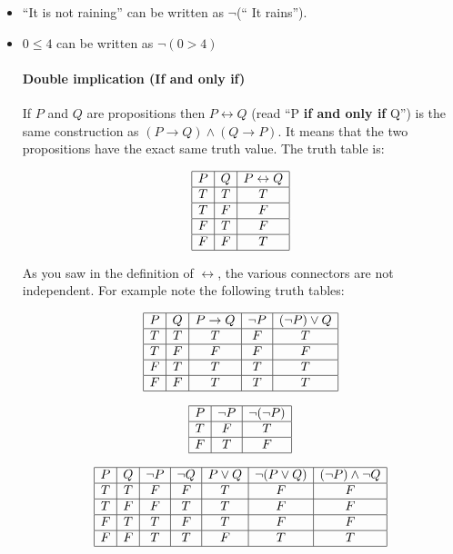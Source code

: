 \begin{itemize}
\item ``It is not raining'' can be written as $\neg$(`` It rains'').
\item $0\le 4$ can be  written as $\neg (0>4)$ 



\paragraph{\bf Double implication (If and only if)}

If $P$ and $Q$ are propositions then $P\leftrightarrow Q$ (read ``P {\bf  if and only if} Q'') is the same construction as $(P\rightarrow Q) \land (Q\rightarrow P)$. It means that the two propositions have the exact same truth value. The truth table is:

$$\begin{array}{|c|c|c|}\hline P & Q & P\leftrightarrow Q \\\hline T & T & T \\\hline T & F & F \\\hline F & T & F \\\hline F & F & T\\ \hline\end{array}$$


As you saw in the definition of $\leftrightarrow$, the various connectors are not independent. For example note the following truth tables:

$$\begin{array}{|c|c|c|c|c|}\hline P & Q & P\rightarrow Q & \neg P & (\neg P)\lor Q \\ \hline T & T & T &F &T\\\hline T & F & F &F &F \\\hline F & T & T &T &T \\\hline F & F & T &T&T\\ \hline\end{array}$$


$$\begin{array}{|c|c|c|}\hline P & \neg P & \neg (\neg P) \\\hline T & F & T \\\hline F & T & F \\\hline\end{array}$$

$$\begin{array}{|c|c|c|c|c|c|c|}\hline P & Q & \neg P & \neg Q & P\lor Q & \neg ( P \lor Q) & (\neg P)\land \neg Q \\ \hline T & T & F &F & T & F & F \\\hline T & F & F &T & T &F & F \\\hline F & T & T & F & T & F & F \\\hline F & F & T &T&F& T & T\\ \hline\end{array}$$



\end{itemize}
